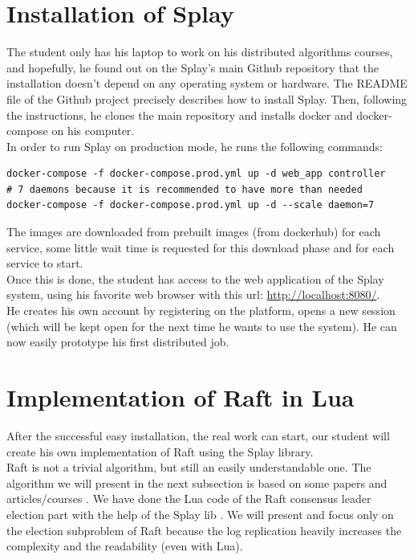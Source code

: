 \documentclass{eplmastersthesis}
\begin{document}
    \section{Installation of Splay}

      The student only has his laptop to work on his distributed algorithms
      courses, and hopefully, he found out on the Splay's main Github
      repository \cite{SplayV2Git} that the installation doesn't depend on
      any operating system or hardware. The README file of the Github project
      precisely describes how to install Splay. Then, following the
      instructions, he clones the main repository and installs docker and
      docker-compose on his computer.\\
      In order to run Splay on production mode, he runs the following
      commands: \\

      \begin{lstlisting}[style=MyBash]
docker-compose -f docker-compose.prod.yml up -d web_app controller
# 7 daemons because it is recommended to have more than needed
docker-compose -f docker-compose.prod.yml up -d --scale daemon=7
      \end{lstlisting}

      The images are downloaded from prebuilt images (from dockerhub) for
      each service, some little wait time is requested for this download
      phase and for each service to start.\\
      Once this is done, the student has access to the web application of
      the Splay system, using his favorite web browser with this url:
      \url{http://localhost:8080/}.\\
      He creates his own account by registering on the platform, opens a new
      session (which will be kept open for the next time he wants to use
      the system). He can now easily prototype his first distributed job.

    \section{Implementation of Raft in Lua}

      After the successful easy installation, the real work can start, our
      student will create his own implementation of Raft using the Splay
      library.\\

      Raft is not a trivial algorithm, but still an easily understandable
      one. The algorithm we will present in the next subsection is based on
      some papers \cite{RaftPaper} and articles/courses \cite{RaftSlide}
      \cite{RaftSite}. We have done the Lua code of the Raft consensus leader
      election part with the help of the Splay lib \cite{SplayLib}.
      We will present and focus only on the election subproblem of
      Raft because the log replication heavily increases the complexity and
      the readability (even with Lua).
\end{document}
